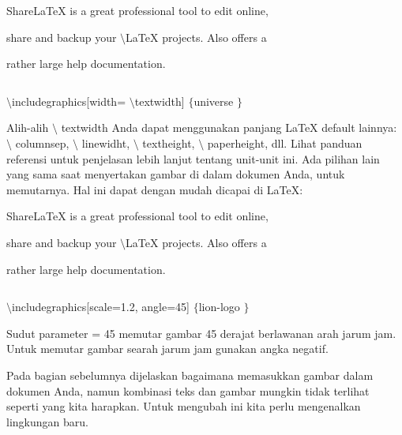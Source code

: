 \vspace{12pt}
\vspace{12pt}
\noindent 
ShareLaTeX is a great professional tool to edit online,  \par
\vspace{12pt}
\noindent 
share and backup your  $  \setminus  $LaTeX projects. Also offers a \par
\noindent 
  \par
\noindent 
rather large help documentation. \par
\noindent 
 $  $ \par
\noindent 
 $  \setminus $includegraphics[width= $  \setminus $textwidth] $  \{  $universe $  \}  $ \par
\vspace{16pt}
\vspace{16pt}
\noindent 
Alih-alih  $  \setminus $ textwidth Anda dapat menggunakan panjang LaTeX default lainnya:  $  \setminus $ columnsep,  $  \setminus $ linewidht,  $  \setminus $ textheight,  $  \setminus $ paperheight, dll. Lihat panduan referensi untuk penjelasan lebih lanjut tentang unit-unit ini. Ada pilihan lain yang sama saat menyertakan gambar di dalam dokumen Anda, untuk memutarnya. Hal ini dapat dengan mudah dicapai di LaTeX: \par
\vspace{12pt}
\vspace{12pt}
\noindent 
ShareLaTeX is a great professional tool to edit online, \par
\noindent 
  \par
\noindent 
share and backup your  $  \setminus $LaTeX projects. Also offers a  \par
\vspace{12pt}
\noindent 
rather large help documentation. \par
\noindent 
 $  $ \par
\noindent 
 $  \setminus $includegraphics[scale=1.2, angle=45] $  \{  $lion-logo $  \}  $ \par
\vspace{12pt}
\vspace{12pt}
\noindent 
Sudut parameter = 45 memutar gambar 45 derajat berlawanan arah jarum jam. Untuk memutar gambar searah jarum jam gunakan angka negatif. \par
\vspace{16pt}
\noindent 
 \hspace*{0.5in} Pada bagian sebelumnya dijelaskan bagaimana memasukkan gambar dalam dokumen Anda, namun kombinasi teks dan gambar mungkin tidak terlihat seperti yang kita harapkan. Untuk mengubah ini kita perlu mengenalkan lingkungan baru. \par

